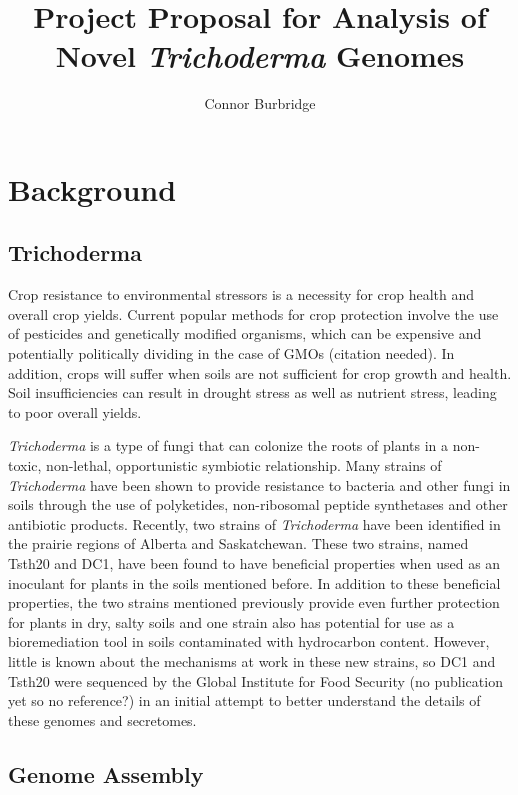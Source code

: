 \documentclass[12pt]{article}
\title{Project Proposal for Analysis of Novel \textit{Trichoderma} Genomes}
\author{Connor Burbridge}
\affil{USask NSID: cbe453 \\
  USask ID no.\ 11162928 \\
  Supervisors: Dave Schneider \& Tony Kusalik\\}
\begin{document}
\parindent=14pt
\maketitle

\clearpage
\tableofcontents
\clearpage

\section{Background}

\subsection{Trichoderma}

Crop resistance to environmental stressors is a necessity for crop
health and overall crop yields. Current popular methods for crop
protection involve the use of pesticides and genetically modified
organisms, which can be expensive and potentially politically dividing
in the case of GMOs (citation needed). In addition, crops will suffer
when soils are not sufficient for crop growth and health. Soil
insufficiencies can result in drought stress as well as nutrient
stress, leading to poor overall yields.

\textit{Trichoderma} is a type of fungi that can colonize the roots of
plants in a non-toxic, non-lethal, opportunistic symbiotic
relationship\cite{Trichoderma}. Many strains of \textit{Trichoderma}
have been shown to provide resistance to bacteria and other fungi in
soils through the use of polyketides, non-ribosomal peptide
synthetases and other antibiotic
products\cite{Trichoderma}\cite{Secretome}. Recently, two strains of
\textit{Trichoderma} have been identified in the prairie regions of
Alberta and Saskatchewan. These two strains, named Tsth20 and DC1,
have been found to have beneficial properties when used as an
inoculant for plants in the soils mentioned before. In addition to
these beneficial properties, the two strains mentioned previously
provide even further protection for plants in dry, salty soils and one
strain also has potential for use as a bioremediation tool in soils
contaminated with hydrocarbon content. However, little is known about
the mechanisms at work in these new strains, so DC1 and Tsth20 were
sequenced by the Global Institute for Food Security (no publication
yet so no reference?) in an initial attempt to better understand the
details of these genomes and secretomes.

\subsection{Genome Assembly}
\end{document}
